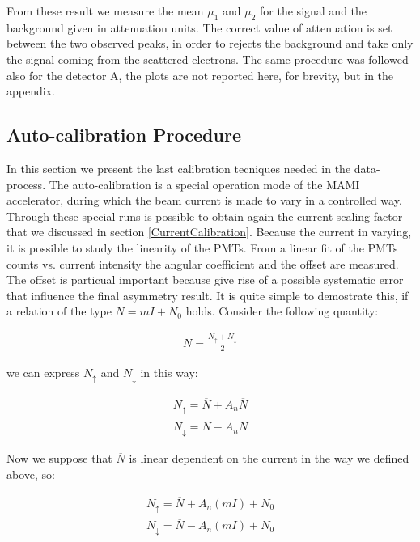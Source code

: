 From these result we measure the mean $\mu_{1}$ and $\mu_{2}$ for the signal and the background given in attenuation units. The correct value of attenuation is set between the two observed peaks, in order to rejects the background and take only the signal coming from the scattered electrons. The same procedure was followed also for the detector A, the plots are not reported here, for brevity, but in the appendix.


\subsection{Auto-calibration Procedure} \label{Autocalib}

In this section we present the last calibration tecniques needed in the data-process. The auto-calibration is a special operation mode of the MAMI accelerator, during which the beam current is made to vary in a controlled way. Through these special runs is possible to obtain again the current scaling factor that we discussed in section \ref{CurrentCalibration}. Because the current in varying, it is possible to study the linearity of the PMTs. From a linear fit of the PMTs counts vs. current intensity the angular coefficient and the offset are measured. The offset is particual important because give rise of a possible systematic error that influence the final asymmetry result. It is quite simple to demostrate this, if a relation of the type $N = mI + N_{0} $ holds. Consider the following quantity:

\begin{align*}
\overline{N} = \frac{N_{\uparrow} + N_{\downarrow}}{2}
\end{align*} 

we can express $N_{\uparrow}$ and $N_{\downarrow}$ in this way:

\begin{align*}
N_{\uparrow} = \overline{N} + A_{n}\overline{N} \\
N_{\downarrow} = \overline{N} - A_{n}\overline{N} 
\end{align*}

Now we suppose that $\overline{N}$ is linear dependent on the current in the way we defined above, so:

\begin{align*}
N_{\uparrow} = \overline{N} + A_{n}(mI) + N_{0} \\
N_{\downarrow} = \overline{N} - A_{n}(mI) + N_{0} 
\end{align*}

